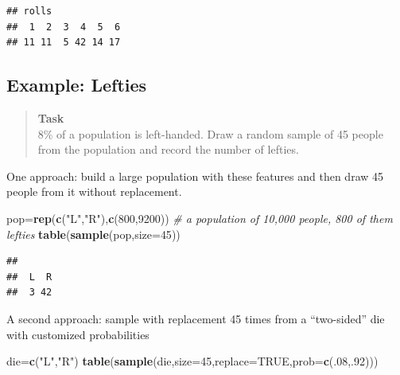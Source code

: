 \documentclass[
]{book}
\newenvironment{Shaded}{\begin{snugshade}}{\end{snugshade}}
\newcommand{\AttributeTok}[1]{\textcolor[rgb]{0.13,0.29,0.53}{#1}}
\newcommand{\CommentTok}[1]{\textcolor[rgb]{0.56,0.35,0.01}{\textit{#1}}}
\newcommand{\ConstantTok}[1]{\textcolor[rgb]{0.56,0.35,0.01}{#1}}
\newcommand{\DecValTok}[1]{\textcolor[rgb]{0.00,0.00,0.81}{#1}}
\newcommand{\FunctionTok}[1]{\textcolor[rgb]{0.13,0.29,0.53}{\textbf{#1}}}
\newcommand{\NormalTok}[1]{#1}
\newcommand{\OtherTok}[1]{\textcolor[rgb]{0.56,0.35,0.01}{#1}}
\newcommand{\StringTok}[1]{\textcolor[rgb]{0.31,0.60,0.02}{#1}}
\theoremstyle{definition}
\theoremstyle{definition}
\theoremstyle{definition}
\theoremstyle{definition}
\theoremstyle{remark}
\begin{document}
\begin{verbatim}
## rolls
##  1  2  3  4  5  6 
## 11 11  5 42 14 17
\end{verbatim}

\subsection{Example: Lefties}\label{example-lefties}

\begin{quote}
\textbf{Task}\\
8\% of a population is left-handed. Draw a random sample of 45 people from the population and record the number of lefties.
\end{quote}

One approach: build a large population with these features and then draw 45 people from it without replacement.

\begin{Shaded}
\begin{Highlighting}[]
\NormalTok{pop}\OtherTok{=}\FunctionTok{rep}\NormalTok{(}\FunctionTok{c}\NormalTok{(}\StringTok{"L"}\NormalTok{,}\StringTok{"R"}\NormalTok{),}\FunctionTok{c}\NormalTok{(}\DecValTok{800}\NormalTok{,}\DecValTok{9200}\NormalTok{)) }\CommentTok{\# a population of 10,000 people, 800 of them lefties}
\FunctionTok{table}\NormalTok{(}\FunctionTok{sample}\NormalTok{(pop,}\AttributeTok{size=}\DecValTok{45}\NormalTok{)) }
\end{Highlighting}
\end{Shaded}

\begin{verbatim}
## 
##  L  R 
##  3 42
\end{verbatim}

A second approach: sample with replacement 45 times from a ``two-sided'' die with customized probabilities

\begin{Shaded}
\begin{Highlighting}[]
\NormalTok{die}\OtherTok{=}\FunctionTok{c}\NormalTok{(}\StringTok{"L"}\NormalTok{,}\StringTok{"R"}\NormalTok{)}
\FunctionTok{table}\NormalTok{(}\FunctionTok{sample}\NormalTok{(die,}\AttributeTok{size=}\DecValTok{45}\NormalTok{,}\AttributeTok{replace=}\ConstantTok{TRUE}\NormalTok{,}\AttributeTok{prob=}\FunctionTok{c}\NormalTok{(.}\DecValTok{08}\NormalTok{,.}\DecValTok{92}\NormalTok{)))}
\end{Highlighting}
\end{Shaded}
\end{document}
